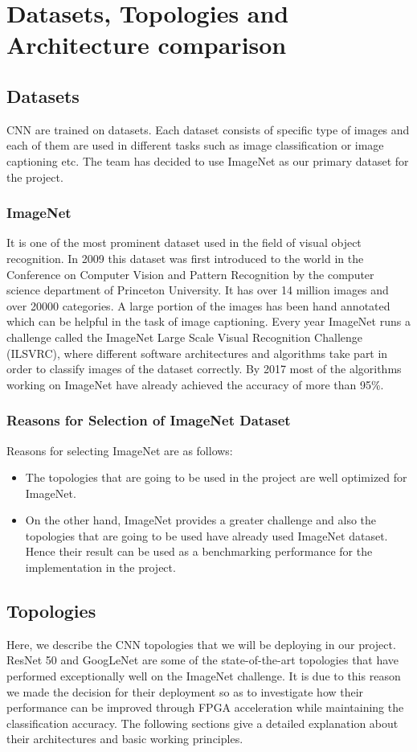 \chapter{Datasets, Topologies and Architecture comparison}

\section{Datasets}
CNN are trained on datasets. Each dataset consists of specific type of images and each of them are used in different tasks such as image classification or image captioning etc. The team has decided to use ImageNet as our primary dataset for the project.
\subsection{ImageNet}
It is one of the most prominent dataset used in the field of visual object recognition. In 2009 this dataset was first introduced to the world in the Conference on Computer Vision and Pattern Recognition by the computer science department of  Princeton University. It has over 14 million images and over 20000 categories. A large portion of the images has been hand annotated which can be helpful in the task of image captioning. Every year ImageNet runs a challenge called the ImageNet Large Scale Visual Recognition Challenge (ILSVRC), where different software architectures and algorithms take part in order to classify images of the dataset correctly. By 2017 most of the algorithms working on ImageNet have already achieved the accuracy of more than 95\%.


\subsection{ Reasons for Selection of ImageNet Dataset}
Reasons for selecting ImageNet are as follows:
\begin{itemize}
    \item The topologies that are going to be used in the project are well optimized for ImageNet. 
    \item On the other hand, ImageNet provides a greater challenge and also the topologies that are going to be used have already used ImageNet dataset. Hence their result can be used as a benchmarking performance for the implementation in the project.
\end{itemize}
\section{Topologies}
Here, we describe the CNN topologies that we will be deploying in our project. ResNet 50 and GoogLeNet are some of the state-of-the-art topologies that have performed exceptionally well on the ImageNet challenge. It is due to this reason we made the decision for their deployment so as to investigate how their performance can be improved through FPGA acceleration while maintaining the classification accuracy. The following sections give a detailed explanation about their architectures and basic working principles.


